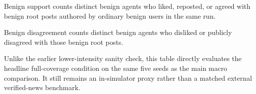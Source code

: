 \begin{table}[t]
\begin{threeparttable}
\begin{tablenotes}[flushleft]
\footnotesize
\item Benign support counts distinct benign agents who liked, reposted, or agreed with benign root posts authored by ordinary benign users in the same run.
\item Benign disagreement counts distinct benign agents who disliked or publicly disagreed with those benign root posts.
\item Unlike the earlier lower-intensity sanity check, this table directly evaluates the headline full-coverage condition on the same five seeds as the main macro comparison. It still remains an in-simulator proxy rather than a matched external verified-news benchmark.
\end{tablenotes}
\end{threeparttable}
\end{table}
